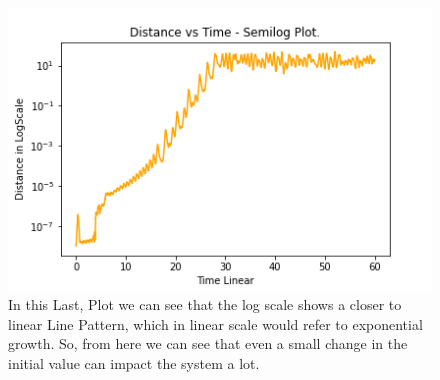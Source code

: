 \documentclass{article}
\begin{document}
\begin{figure}[!htb]
  \centering
  \includegraphics[width=1\linewidth]{q2_3.png}
  \caption{In this Last, Plot we can see that the log scale shows a closer to linear Line Pattern, which in linear scale would refer to exponential growth. So, from here we can see that even a small change in the initial value can impact the system a lot. }
  \label{fig:q3_3.png}
\end{figure}
\end{document}
